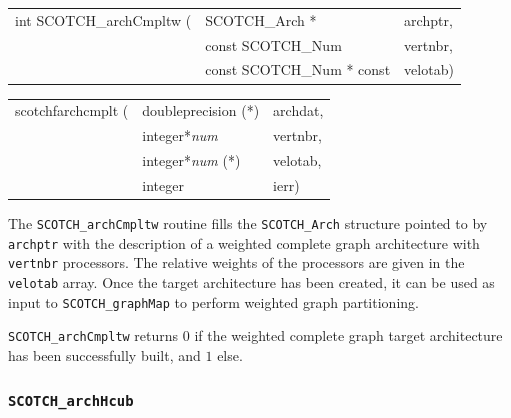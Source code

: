 \begin{itemize}
\progsyn

{\tt\begin{tabular}{l@{}ll}
int SCOTCH\_archCmpltw ( & SCOTCH\_Arch *            & archptr, \\
                         & const SCOTCH\_Num         & vertnbr, \\
                         & const SCOTCH\_Num * const & velotab)
\end{tabular}}

{\tt\begin{tabular}{l@{}ll}
scotchfarchcmplt ( & doubleprecision (*)   & archdat, \\
                   & integer*{\it num}     & vertnbr, \\
                   & integer*{\it num} (*) & velotab, \\
                   & integer               & ierr)
\end{tabular}}

\progdes

The {\tt SCOTCH\_archCmpltw} routine fills the {\tt SCOTCH\_\lbt Arch}
structure pointed to by {\tt archptr} with the description of a
weighted complete graph architecture with {\tt vertnbr} processors.
The relative weights of the processors are given in the {\tt velotab}
array. Once the target architecture has been created, it can be
used as input to {\tt SCOTCH\_\lbt graph\lbt Map} to perform weighted
graph partitioning.

\progret

{\tt SCOTCH\_archCmpltw} returns $0$ if the weighted complete graph target
architecture has been successfully built, and $1$ else.
\end{itemize}

\subsubsection{{\tt SCOTCH\_archHcub}}

